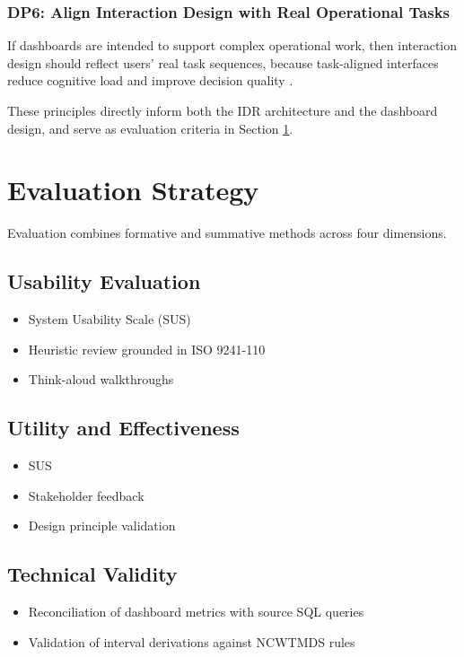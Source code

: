 \subsubsection*{DP6: Align Interaction Design with Real Operational Tasks}
If dashboards are intended to support complex operational work, then interaction design should reflect users’ real task sequences, because task-aligned interfaces reduce cognitive load and improve decision quality \citep{internationalorganizationforstandardization2020}.

These principles directly inform both the IDR architecture and the dashboard design, and serve as evaluation criteria in Section \ref{EvalStrat}.

\section{Evaluation Strategy} \label{EvalStrat}

Evaluation combines formative and summative methods across four dimensions.

\subsection{Usability Evaluation}
\begin{itemize}
    \item System Usability Scale (SUS)
    \item Heuristic review grounded in ISO 9241-110
    \item Think-aloud walkthroughs
\end{itemize}

\subsection{Utility and Effectiveness}

\begin{itemize}
    \item SUS
    \item Stakeholder feedback
    \item Design principle validation
\end{itemize}

\subsection{Technical Validity}
\begin{itemize}
    \item Reconciliation of dashboard metrics with source SQL queries
    \item Validation of interval derivations against NCWTMDS rules
\end{itemize}

